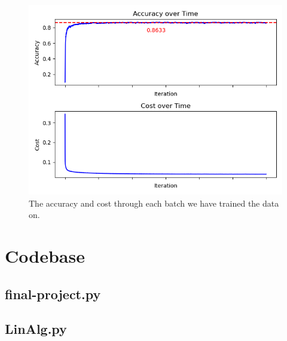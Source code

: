 \documentclass[a4paper,oneside,article,english]{memoir}
\begin{document}
\begin{figure}[H]
  \centering
  \includegraphics[scale = 0.7]{cost_accuracy_with_line.png}
  \caption{The accuracy and cost through each batch we have trained the data on.}
  \label{fig:cost-accuracy}
\end{figure}

\section{Codebase}  
\label{sec:codebase}

\subsection{final-project.py}
\label{sub:final_project_py}



\subsection{LinAlg.py}
\label{sub:linAlg_py}

\end{document}
